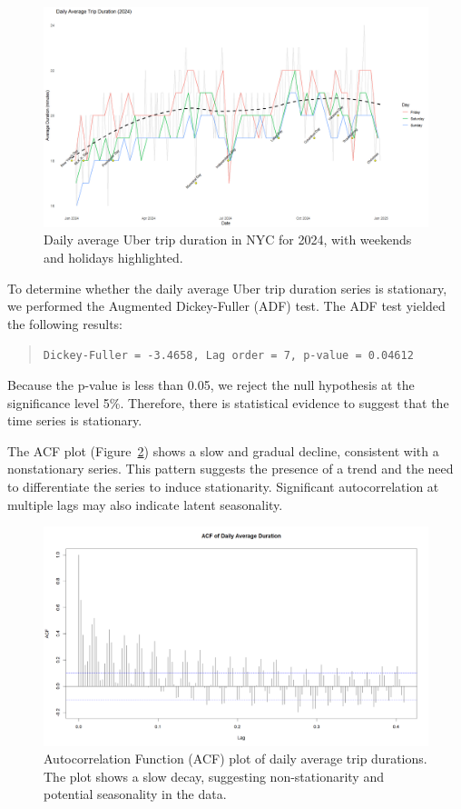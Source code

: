 \documentclass{article}
\begin{document}
\begin{figure}
  \centering
  \includegraphics[width=\textwidth]{avg_trip_duration_by_day.png}
  \caption{Daily average Uber trip duration in NYC for 2024, with weekends and holidays highlighted.}
  \label{fig:timeseries_plot}
\end{figure}


To determine whether the daily average Uber trip duration series is stationary, we performed the Augmented Dickey-Fuller (ADF) test. The ADF test yielded the following results:

\begin{quote}
\texttt{Dickey-Fuller = -3.4658, Lag order = 7, p-value = 0.04612}
\end{quote}

Because the p-value is less than 0.05, we reject the null hypothesis at the significance level 5\%. Therefore, there is statistical evidence to suggest that the time series is stationary.

The ACF plot (Figure~\ref{fig:acf_plot}) shows a slow and gradual decline, consistent with a nonstationary series. This pattern suggests the presence of a trend and the need to differentiate the series to induce stationarity. Significant autocorrelation at multiple lags may also indicate latent seasonality.

\begin{figure}
  \centering
  \includegraphics[width=\textwidth]{finalproject/images/acf-plot.png}
  \caption{Autocorrelation Function (ACF) plot of daily average trip durations. The plot shows a slow decay, suggesting non-stationarity and potential seasonality in the data.}
  \label{fig:acf_plot}
\end{figure}
\end{document}
